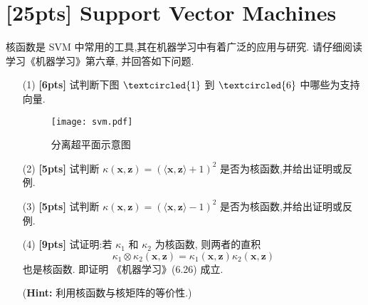 \documentclass[a4paper,UTF8]{article}
\numberwithin{equation}{section}
\theoremstyle{definition}
\def \x {\boldsymbol{x}}
\def \z {\mathbf{z}}
\begin{document}
\newpage
\section{[25pts] Support Vector Machines}
核函数是 SVM 中常用的工具,其在机器学习中有着广泛的应用与研究. 请仔细阅读学习《机器学习》第六章, 并回答如下问题.
\begin{enumerate}
	\item[(1)] \textbf{[6pts]} 试判断下图 $\textcircled{1}$ 到 $\textcircled{6}$ 中哪些为支持向量.
        \begin{figure}[!htbp]
		\centering
			\texttt{[image: svm.pdf]}\\
			\caption{分离超平面示意图}
	\end{figure}
        \item[(2)] \textbf{[5pts]} 试判断 $\kappa(\x, \z) = \left(\langle\x, \z\rangle + 1\right)^2$ 是否为核函数,并给出证明或反例.
        \item[(3)] \textbf{[5pts]} 试判断 $\kappa(\x, \z) = \left(\langle\x, \z\rangle - 1\right)^2$ 是否为核函数,并给出证明或反例.
	\item[(4)] \textbf{[9pts]} 试证明:若 $\kappa_1$ 和 $\kappa_2$ 为核函数, 则两者的直积
	\[
	\kappa_1 \otimes \kappa_2(\x, \z)=\kappa_1(\x, \z) \kappa_2(\x, \z)
	\]
	也是核函数. 即证明 《机器学习》(6.26) 成立.

 (\textbf{Hint:} 利用核函数与核矩阵的等价性.)

	
\end{enumerate}
\end{document}
